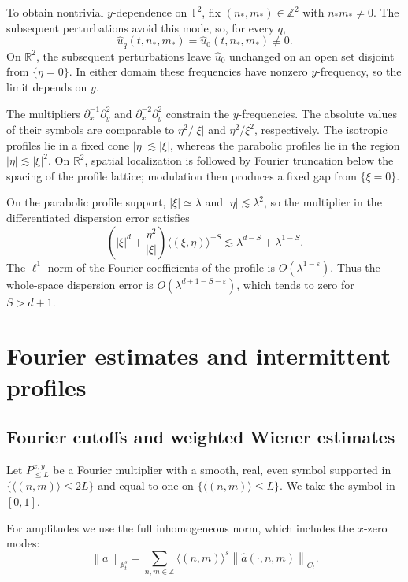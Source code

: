 \documentclass[12pt,reqno,letterpaper]{amsart}
\numberwithin{equation}{section}
\theoremstyle{definition}
\newcommand{\T}{\mathbb T}
\newcommand{\R}{\mathbb R}
\newcommand{\Z}{\mathbb Z}
\newcommand{\A}{\mathbb A}
\newcommand{\eps}{\varepsilon}
\newcommand{\la}{\lambda}
\newcommand{\norm}[1]{\left\lVert #1\right\rVert}
\newcommand{\abs}[1]{\left\lvert #1\right\rvert}
\begin{document}
To obtain nontrivial $y$-dependence on $\T^2$, fix
$(n_*,m_*)\in\Z^2$ with $n_*m_*\neq0$.  The subsequent perturbations
avoid this mode, so, for every $q$,
\[
 \widehat u_q(t,n_*,m_*)
 =\widehat u_0(t,n_*,m_*)\not\equiv0.
\]
On $\R^2$, the subsequent perturbations leave $\widehat u_0$ unchanged
on an open set disjoint from $\{\eta=0\}$.  In either domain these
frequencies have nonzero $y$-frequency, so the limit depends on $y$.

The multipliers $\partial_x^{-1}\partial_y^2$ and
$\partial_x^{-2}\partial_y^2$ constrain the $y$-frequencies.  The absolute
values of their symbols are comparable to $\eta^2/\abs\xi$ and
$\eta^2/\xi^2$, respectively.  The
isotropic profiles lie in a fixed cone $\abs\eta\lesssim\abs\xi$,
whereas the parabolic profiles lie in the region
$\abs\eta\lesssim\abs\xi^2$.  On $\R^2$, spatial
localization is followed by Fourier truncation below the spacing of the
profile lattice; modulation then produces a fixed gap from
$\{\xi=0\}$.

On the parabolic profile support, $\abs\xi\simeq\la$ and
$\abs\eta\lesssim\la^2$, so the multiplier in the differentiated
dispersion error satisfies
\[
 \left(\abs\xi^d+\frac{\eta^2}{\abs\xi}\right)
 \langle(\xi,\eta)\rangle^{-S}
 \lesssim\la^{d-S}+\la^{1-S}.
\]
The $\ell^1$ norm of the Fourier coefficients of the profile is
$O(\la^{1-\eps})$.  Thus the whole-space dispersion error is
$O(\la^{d+1-S-\eps})$, which tends to zero for $S>d+1$.

\section{Fourier estimates and intermittent profiles}

\subsection{Fourier cutoffs and weighted Wiener estimates}

Let $P_{\leq L}^{x,y}$ be a Fourier multiplier with a smooth, real, even
symbol supported in $\{\langle(n,m)\rangle\leq2L\}$ and equal to one on
$\{\langle(n,m)\rangle\leq L\}$.  We take the symbol in $[0,1]$.

For amplitudes we use the full inhomogeneous norm, which includes the
$x$-zero modes:
\begin{equation}\label{eq:fullwiener}
    \norm{a}_{\A^s_t}
    =\sum_{n,m\in\Z}\langle(n,m)\rangle^s
      \norm{\widehat a(\cdot,n,m)}_{C_t}.
\end{equation}
\end{document}
